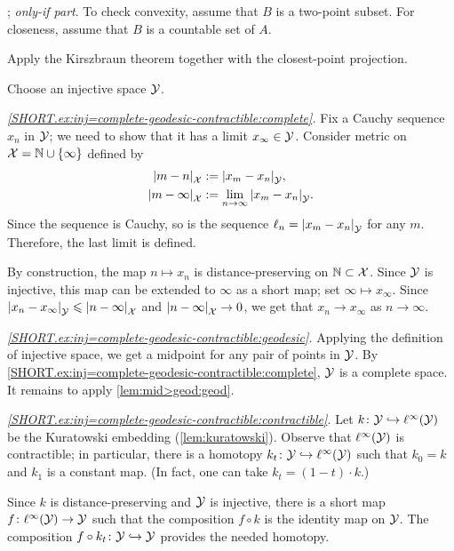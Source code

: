 \parbf{\ref{ex:conv-short}}; \textit{only-if part}.
To check convexity, assume that $B$ is a two-point subset.
For closeness, assume that $B$ is a countable set of $A$.

Apply the Kirszbraun theorem together with the closest-point projection.

\setcounter{eqtn}{0}


Choose an injective space $\mathcal{Y}$.

\textit{\ref{SHORT.ex:inj=complete-geodesic-contractible:complete}.}
Fix a Cauchy sequence $x_n$ in $\mathcal{Y}$;
we need to show that it has a limit $x_\infty\in \mathcal{Y}$.
Consider metric on $\mathcal{X}=\mathbb{N}\cup\{\infty\}$ defined by 
\begin{align*}
\dist{m}{n}{\spc{X}}&\df\dist{x_m}{x_n}{\spc{Y}},
\\
\dist{m}{\infty}{\spc{X}}&\df\lim_{n\to\infty}\dist{x_m}{x_n}{\spc{Y}}.
\end{align*}
Since the sequence is Cauchy, so is the sequence $\ell_n=\dist{x_m}{x_n}{\spc{Y}}$ for any $m$.
Therefore, the last limit is defined.

By construction, the map $n\mapsto x_n$ is distance-preserving on $\mathbb{N}\subset \mathcal{X}$.
Since $\mathcal{Y}$ is injective, this map can be extended to $\infty$ as a short map; set $\infty\mapsto x_\infty$.
Since $\dist{x_n}{x_\infty}{\spc{Y}}\le \dist{n}{\infty}{\spc{X}}$ 
and $\dist{n}{\infty}{\spc{X}}\to 0$, we get that
$x_n\to x_\infty$ as $n\to\infty$.

\textit{\ref{SHORT.ex:inj=complete-geodesic-contractible:geodesic}.}
Applying the definition of injective space, we get a midpoint for any pair of points in $\mathcal{Y}$.
By \ref{SHORT.ex:inj=complete-geodesic-contractible:complete},
$\mathcal{Y}$ is a complete space.
It remains to apply \ref{lem:mid>geod:geod}.

\textit{\ref{SHORT.ex:inj=complete-geodesic-contractible:contractible}.}
Let $k\colon\mathcal{Y}\hookrightarrow \ell^\infty(\mathcal{Y})$ be the Kuratowski embedding (\ref{lem:kuratowski}).
Observe that $\ell^\infty(\mathcal{Y})$ is contractible;
in particular, there is a homotopy $k_t\colon\mathcal{Y}\hookrightarrow \ell^\infty(\mathcal{Y})$ such that $k_0=k$ and $k_1$ is a constant map.
(In fact, one can take $k_t=(1-t)\cdot k$.)

Since $k$ is distance-preserving and $\mathcal{Y}$ is injective,
there is a short map $f\colon\ell^\infty(\mathcal{Y})\to \mathcal{Y}$ such that the composition $f\circ k$ is the identity map on $\mathcal{Y}$.
The composition $f\circ k_t\colon\mathcal{Y}\hookrightarrow \mathcal{Y}$ provides the needed homotopy. 

